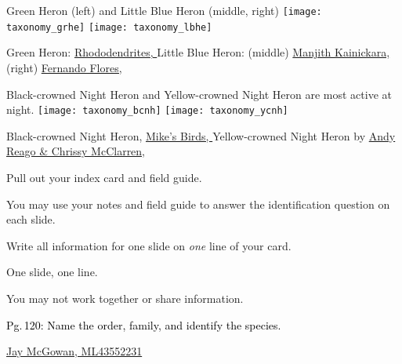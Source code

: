 \documentclass[t]{beamer}
\begin{document}
\begin{frame}{Green Heron (left) and Little Blue Heron (middle, right)}
\texttt{[image: taxonomy\_grhe]}\hfill 
\texttt{[image: taxonomy\_lbhe]}

\vfilll

\tiny Green Heron: \href{https://commons.wikimedia.org/wiki/File:Green_heron_in_PP_(14296).jpg}{Rhododendrites, } \hfill Little Blue Heron: (middle) \href{https://flickr.com/photos/manjithkaini/4686037391}{Manjith Kainickara, }\hfill (right) \href{https://flickr.com/photos/ferjflores/10765140464}{Fernando Flores, }
\end{frame}

\begin{frame}{Black-crowned Night Heron and Yellow-crowned Night Heron are most active at night.}
\texttt{[image: taxonomy\_bcnh]} \hfill
\texttt{[image: taxonomy\_ycnh]}

\vfilll

\tiny Black-crowned Night Heron, \href{https://flickr.com/photos/pazzani/6021109879}{Mike's Birds, } \hfill Yellow-crowned Night Heron by \href{https://flickr.com/photos/wildreturn/51220695991}{Andy Reago \& Chrissy McClarren, }
\end{frame}


\begin{frame}{Pull out your index card and field guide.}

	\hangpara You may use your notes and field guide to answer the identification question on each slide.

	\hangpara Write all information for one slide on \textit{one} line of your card.
	
	\hangpara One slide, one line.
	
	\hangpara You may not work together or share information.
	
	
\end{frame}

{
	\begin{frame}[t]{\textcolor{black}{Pg.\,120: Name the order, family, and identify the species.}}
		
		\tinyfill  \textcolor{white}{\href{https://macaulaylibrary.org/asset/43552231}{Jay McGowan, ML43552231}}
	\end{frame}
}
\end{document}
